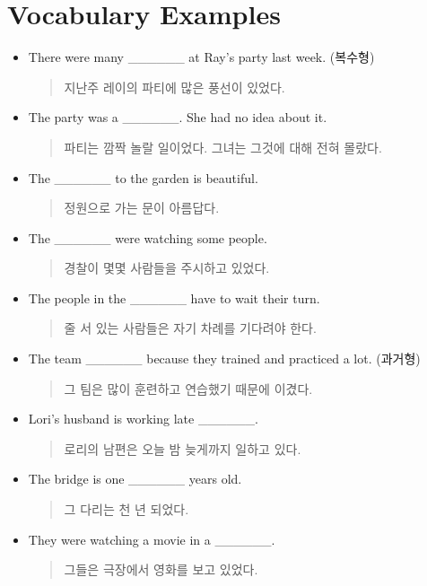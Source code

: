 \documentclass{article}
\begin{document}
\section*{Vocabulary Examples}
\begin{addmargin}[1em]{1em}
\begin{itemize}
    \item There were many \_\_\_\_\_\_ at Ray's party last week. (복수형)
    \begin{quote}
    지난주 레이의 파티에 많은 풍선이 있었다.
    \end{quote}
    \item The party was a \_\_\_\_\_\_. She had no idea about it.
    \begin{quote}
    파티는 깜짝 놀랄 일이었다. 그녀는 그것에 대해 전혀 몰랐다.
    \end{quote}
    \item The \_\_\_\_\_\_ to the garden is beautiful.
    \begin{quote}
    정원으로 가는 문이 아름답다.
    \end{quote}
    \item The \_\_\_\_\_\_ were watching some people.
    \begin{quote}
    경찰이 몇몇 사람들을 주시하고 있었다.
    \end{quote}
    \item The people in the \_\_\_\_\_\_ have to wait their turn.
    \begin{quote}
    줄 서 있는 사람들은 자기 차례를 기다려야 한다.
    \end{quote}
    \item The team \_\_\_\_\_\_ because they trained and practiced a lot. (과거형)
    \begin{quote}
    그 팀은 많이 훈련하고 연습했기 때문에 이겼다.
    \end{quote}
    \item Lori's husband is working late \_\_\_\_\_\_.
    \begin{quote}
    로리의 남편은 오늘 밤 늦게까지 일하고 있다.
    \end{quote}
    \item The bridge is one \_\_\_\_\_\_ years old.
    \begin{quote}
    그 다리는 천 년 되었다.
    \end{quote}
    \item They were watching a movie in a \_\_\_\_\_\_.
    \begin{quote}
    그들은 극장에서 영화를 보고 있었다.

\end{quote}
\end{itemize}
\end{addmargin}
\end{document}
